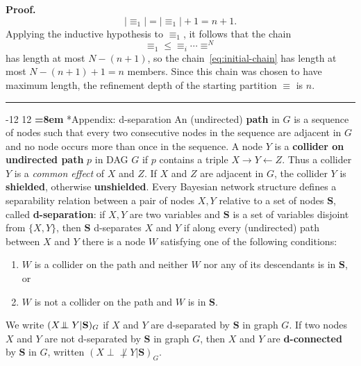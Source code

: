 \documentclass{elsarticle}%
\makeatletter
\renewcommand\section{\@startsection {section}{1}{\z@}%
  {-12\p@ \@plus -4\p@ \@minus -4\p@}%
                       {12\p@ \@plus 4\p@ \@minus 4\p@}%
                                   {\normalfont\large\bfseries\boldmath
                                   \rightskip=\z@ \@plus 8em\pretolerance=10000 }}
\renewenvironment{proof}[1][Proof]{\noindent\textbf{#1.} }{\ \rule{0.5em}{0.5em}}
\newcommand{\indep}{\ensuremath{\perp{}\!\!\!\!\!\!\!\perp{}}}
\newcommand{\dep}{\ensuremath{{\perp{}\!\!\!\!\!\!\!\not  \perp{}}}}
\renewcommand{\S}{\mathbf{{S}}}
\newcommand{\X}{X}
\newcommand{\Y}{Y}
\newcommand{\Z}{Z}
\newcommand{\G}{G}
\newcommand{\isincluded}{\leq}
\newcommand{\partition}{\equiv}
\makeatother
\begin{document}
\begin{proof}
$$|\partition_{1}| = |\partition_{1}|+1 = n+1.$$
Applying the inductive hypothesis to $\partition_{1}$, it follows that the  chain 
$$\partition_{1} \isincluded \partition_{i} \cdots \partition^{N}$$ has length at most $N-(n+1)$, so the chain~\eqref{eq:initial-chain} has length at most $N-(n+1)+1 = n$ members. Since this chain was chosen to have maximum length, the refinement depth of the starting partition $\partition$ is $n$. 
\end{proof}

\section*{Appendix: d-separation}
An (undirected) \textbf{path} in $G$ is a sequence of nodes such that every two consecutive
nodes in the sequence are adjacent in $G$ and no node occurs more than once in the sequence.
A node $\Y$ is a {\bf collider on undirected path} $p$ in DAG $G$ if $p$ contains a triple $\X \rightarrow \Y \leftarrow \Z$. Thus a collider $\Y$ is a {\em common effect} of $\X$ and $\Z$. If $\X$ and $\Z$ are adjacent in $\G$, the collider $\Y$ is \textbf{shielded}, otherwise \textbf{unshielded}. 
Every Bayesian network structure defines a %
separability relation
between a pair of nodes $X,Y$ relative to a set of nodes $\S$,
called {\bf d-separation}: %
if $X,Y$ are two variables and $\S$ is a set of variables disjoint from
$\{X,Y\}$, then $\mathbf{S}$ d-separates $X$ and $Y$ if along every (undirected) path
between $X$ and $Y$ there is a node $W$ satisfying one of the following
conditions:

\begin{enumerate}
\item $W$ is a collider on the path and neither $W$ nor any of its descendants is in $\S$, or 
\item $W$ is not a collider on the path and $W$ is in $\S$.
\end{enumerate}
We write $(X \protect{\indep} Y| \S)_G$ if $X$ and $Y$ are d-separated by $\S$ in graph
$G$. If two nodes $X$ and $Y$ are not d-separated by $\S$ in graph $G$, then
$X$ and $Y$ are {\bf d-connected} by $\S$ in $G$, written $(X \dep Y|
\S)_G$. 
\end{document}

